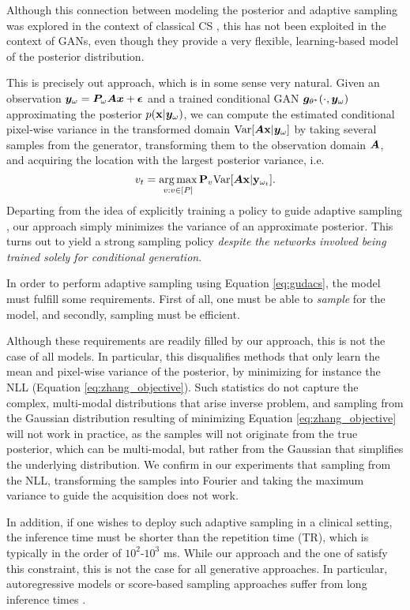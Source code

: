 Although this connection between modeling the posterior and adaptive sampling was explored in the context of classical CS \citep{ji2008bayesian,seeger2010optimization}, this has not been exploited in the context of GANs, even though they provide a very flexible, learning-based model of the posterior distribution. 

This is precisely out approach, which is in some sense very natural. Given an observation ${\bm{y}}_\omega = {\bm{P}}_\omega {\bm{A}} {\bm{x}} +\boldsymbol{\epsilon}$ and a trained conditional GAN ${\bm{g}}_{\theta^*}(\cdot, {\bm{y}}_\omega)$ approximating the posterior $p({\mathbf{x}}|{\bm{y}}_\omega)$, we can compute the estimated conditional pixel-wise variance in the transformed domain $\text{Var}[{\bm{A}}{\mathbf{x}}|{\bm{y}}_\omega]$ by taking several samples from the generator, transforming them to the observation domain ${\bm{A}}$, and acquiring the location with the largest posterior variance, i.e. 
\begin{equation}
    v_t = \operatorname*{arg\,max}_{v: v\in [P]} \mathbf{P}_{v} \text{Var}[{\bm{A}} {\mathbf{x}} | {\mathbf{y}}_{\omega_t}]. \label{eq:gudacs} 
\end{equation}
Departing from the idea of explicitly training a policy to guide adaptive sampling \citep{jin2019self, zhang2019reducing,pineda2020active,bakker2020experimental}, our approach simply minimizes the variance of an approximate posterior. This turns out to yield a strong sampling policy \textit{despite the networks involved being trained solely for conditional generation}.

\begin{remark}
    In order to perform adaptive sampling using Equation \ref{eq:gudacs}, the model must fulfill some requirements. First of all, one must be able to \textit{sample} for the model, and secondly, sampling must be efficient. 

    Although these requirements are readily filled by our approach, this is not the case of all models. In particular, this disqualifies methods that only learn the mean and pixel-wise variance of the posterior, by minimizing for instance the NLL (Equation \ref{eq:zhang_objective}). Such statistics do not capture the complex, multi-modal distributions that arise inverse problem, and sampling from the Gaussian distribution resulting of minimizing Equation \ref{eq:zhang_objective} will not work in practice, as the samples will not originate from the true posterior, which can be multi-modal, but rather from the Gaussian that simplifies the underlying distribution. We confirm in our experiments that sampling from the NLL, transforming the samples into Fourier and taking the maximum variance to guide the acquisition does not work.

    In addition, if one wishes to deploy such adaptive sampling in a clinical setting, the inference time must be shorter than the repetition time (TR), which is typically in the order of $10^2$-$10^3$ ms. While our approach and the one of \citet{zhang2019reducing} satisfy this constraint, this is not the case for all generative approaches. In particular, autoregressive models \citep{van2016pixel} or score-based sampling approaches suffer from long inference times \citep{song2021solving}. 
\end{remark}

